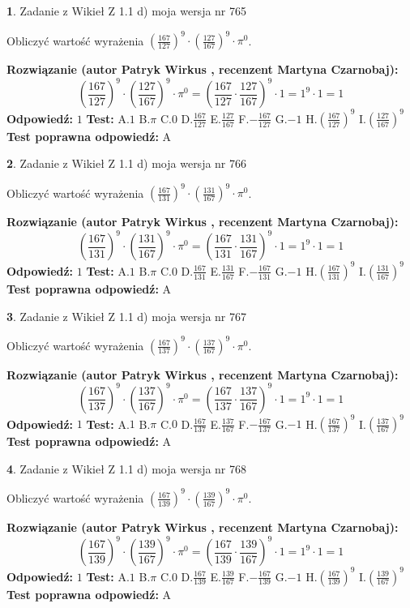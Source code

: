 \documentclass[12pt, a4paper]{article}
\theoremstyle{definition} %
\newtheorem{zad}{}
\newcommand{\zadStart}[1]{\begin{zad}#1\newline}
\newcommand{\zadStop}{\end{zad}}
\newcommand{\rozwStart}[2]{\noindent \textbf{Rozwiązanie (autor #1 , recenzent #2): }\newline}
\newcommand{\rozwStop}{\newline}
\newcommand{\odpStart}{\noindent \textbf{Odpowiedź:}\newline}
\newcommand{\odpStop}{\newline}
\newcommand{\testStart}{\noindent \textbf{Test:}\newline}
\newcommand{\testStop}{\newline}
\newcommand{\kluczStart}{\noindent \textbf{Test poprawna odpowiedź:}\newline}
\newcommand{\kluczStop}{\newline}
\begin{document}
\zadStart{Zadanie z Wikieł Z 1.1 d) moja wersja nr 765}

Obliczyć wartość wyrażenia $(\frac{167}{127})^{9} \cdot (\frac{127}{167})^{9} \cdot \pi^{0}$.
\zadStop
\rozwStart{Patryk Wirkus}{Martyna Czarnobaj}
$$(\frac{167}{127})^{9} \cdot (\frac{127}{167})^{9} \cdot \pi^{0} = (\frac{167}{127} \cdot \frac{127}{167})^{9} \cdot 1 = 1^{9} \cdot 1 = 1$$
\rozwStop
\odpStart
$1$
\odpStop
\testStart
A.$1$ B.$\pi$ C.$0$ D.$\frac{167}{127}$ E.$\frac{127}{167}$
F.$-\frac{167}{127}$ G.$-1$
H.$(\frac{167}{127})^{9}$
I.$(\frac{127}{167})^{9}$
\testStop
\kluczStart
A
\kluczStop



\zadStart{Zadanie z Wikieł Z 1.1 d) moja wersja nr 766}

Obliczyć wartość wyrażenia $(\frac{167}{131})^{9} \cdot (\frac{131}{167})^{9} \cdot \pi^{0}$.
\zadStop
\rozwStart{Patryk Wirkus}{Martyna Czarnobaj}
$$(\frac{167}{131})^{9} \cdot (\frac{131}{167})^{9} \cdot \pi^{0} = (\frac{167}{131} \cdot \frac{131}{167})^{9} \cdot 1 = 1^{9} \cdot 1 = 1$$
\rozwStop
\odpStart
$1$
\odpStop
\testStart
A.$1$ B.$\pi$ C.$0$ D.$\frac{167}{131}$ E.$\frac{131}{167}$
F.$-\frac{167}{131}$ G.$-1$
H.$(\frac{167}{131})^{9}$
I.$(\frac{131}{167})^{9}$
\testStop
\kluczStart
A
\kluczStop



\zadStart{Zadanie z Wikieł Z 1.1 d) moja wersja nr 767}

Obliczyć wartość wyrażenia $(\frac{167}{137})^{9} \cdot (\frac{137}{167})^{9} \cdot \pi^{0}$.
\zadStop
\rozwStart{Patryk Wirkus}{Martyna Czarnobaj}
$$(\frac{167}{137})^{9} \cdot (\frac{137}{167})^{9} \cdot \pi^{0} = (\frac{167}{137} \cdot \frac{137}{167})^{9} \cdot 1 = 1^{9} \cdot 1 = 1$$
\rozwStop
\odpStart
$1$
\odpStop
\testStart
A.$1$ B.$\pi$ C.$0$ D.$\frac{167}{137}$ E.$\frac{137}{167}$
F.$-\frac{167}{137}$ G.$-1$
H.$(\frac{167}{137})^{9}$
I.$(\frac{137}{167})^{9}$
\testStop
\kluczStart
A
\kluczStop



\zadStart{Zadanie z Wikieł Z 1.1 d) moja wersja nr 768}

Obliczyć wartość wyrażenia $(\frac{167}{139})^{9} \cdot (\frac{139}{167})^{9} \cdot \pi^{0}$.
\zadStop
\rozwStart{Patryk Wirkus}{Martyna Czarnobaj}
$$(\frac{167}{139})^{9} \cdot (\frac{139}{167})^{9} \cdot \pi^{0} = (\frac{167}{139} \cdot \frac{139}{167})^{9} \cdot 1 = 1^{9} \cdot 1 = 1$$
\rozwStop
\odpStart
$1$
\odpStop
\testStart
A.$1$ B.$\pi$ C.$0$ D.$\frac{167}{139}$ E.$\frac{139}{167}$
F.$-\frac{167}{139}$ G.$-1$
H.$(\frac{167}{139})^{9}$
I.$(\frac{139}{167})^{9}$
\testStop
\kluczStart
A
\kluczStop
\end{document}
